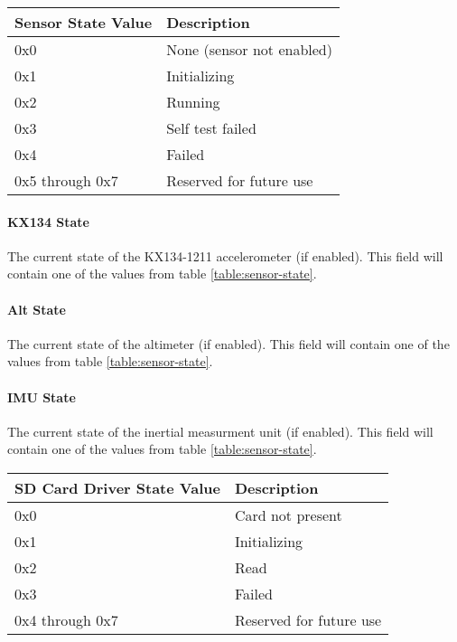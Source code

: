 \begin{table*}[htb]
    \centering
    \begin{tabular}{@{}ll@{}}
        \toprule
        Sensor State Value & Description               \\
        \midrule
        0x0                & None (sensor not enabled) \\
        0x1                & Initializing              \\
        0x2                & Running                   \\
        0x3                & Self test failed          \\
        0x4                & Failed                    \\
        0x5 through 0x7    & Reserved for future use   \\
        \bottomrule
    \end{tabular}
    \caption{Sensor States}
    \label{table:sensor-state}
\end{table*}

\paragraph{KX134 State}
The current state of the KX134-1211 accelerometer (if enabled). This field will contain one of the values from table
\ref{table:sensor-state}.

\paragraph{Alt State}
The current state of the altimeter (if enabled). This field will contain one of the values from table
\ref{table:sensor-state}.

\paragraph{IMU State}
The current state of the inertial measurment unit (if enabled). This field will contain one of the values from table
\ref{table:sensor-state}.

\begin{table*}[htb]
    \centering
    \begin{tabular}{@{}ll@{}}
        \toprule
        SD Card Driver State Value & Description             \\
        \midrule
        0x0                        & Card not present        \\
        0x1                        & Initializing            \\
        0x2                        & Read                    \\
        0x3                        & Failed                  \\
        0x4 through 0x7            & Reserved for future use \\
        \bottomrule
    \end{tabular}
    \caption{SD Card Driver States}
    \label{table:sd-state}
\end{table*}

